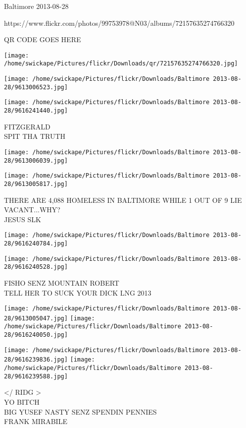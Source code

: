 \documentclass[10pt,letterpaper]{article}
\begin{document}
Baltimore 2013-08-28

https://www.flickr.com/photos/99753978@N03/albums/72157635274766320

QR CODE GOES HERE

\texttt{[image: /home/swickape/Pictures/flickr/Downloads/qr/72157635274766320.jpg]}
\pagebreak

\texttt{[image: /home/swickape/Pictures/flickr/Downloads/Baltimore 2013-08-28/9613006523.jpg]}

\vspace{0.25in}
\texttt{[image: /home/swickape/Pictures/flickr/Downloads/Baltimore 2013-08-28/9616241440.jpg]}

FITZGERALD\\
SPIT THA TRUTH\\
\pagebreak

\texttt{[image: /home/swickape/Pictures/flickr/Downloads/Baltimore 2013-08-28/9613006039.jpg]}

\vspace{0.25in}
\texttt{[image: /home/swickape/Pictures/flickr/Downloads/Baltimore 2013-08-28/9613005817.jpg]}

THERE ARE 4,088 HOMELESS IN BALTIMORE WHILE 1 OUT OF 9 LIE VACANT...WHY?\\
JESUS SLK\\
\pagebreak

\texttt{[image: /home/swickape/Pictures/flickr/Downloads/Baltimore 2013-08-28/9616240784.jpg]}

\vspace{0.25in}
\texttt{[image: /home/swickape/Pictures/flickr/Downloads/Baltimore 2013-08-28/9616240528.jpg]}

FISHO SENZ MOUNTAIN ROBERT\\
TELL HER TO SUCK YOUR DICK LNG 2013\\
\pagebreak

\texttt{[image: /home/swickape/Pictures/flickr/Downloads/Baltimore 2013-08-28/9613005047.jpg]}
\texttt{[image: /home/swickape/Pictures/flickr/Downloads/Baltimore 2013-08-28/9616240050.jpg]}

\texttt{[image: /home/swickape/Pictures/flickr/Downloads/Baltimore 2013-08-28/9616239836.jpg]}
\texttt{[image: /home/swickape/Pictures/flickr/Downloads/Baltimore 2013-08-28/9616239588.jpg]}

</  RIDG >\\
YO BITCH\\
BIG YUSEF NASTY SENZ SPENDIN PENNIES\\
FRANK MIRABILE\\
\pagebreak
\end{document}

